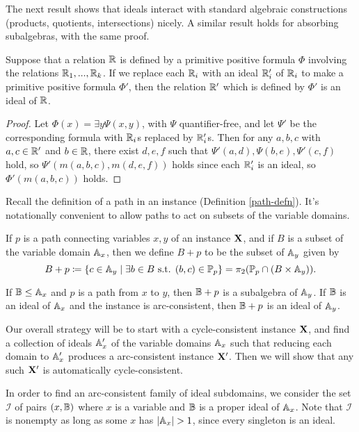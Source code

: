 \documentclass[letterpaper,11pt]{article}
\begin{document}
The next result shows that ideals interact with standard algebraic constructions (products, quotients, intersections) nicely. A similar result holds for absorbing subalgebras, with the same proof.

\begin{prop} Suppose that a relation $\mathbb{R}$ is defined by a primitive positive formula $\Phi$ involving the relations $\mathbb{R}_1, ..., \mathbb{R}_k$. If we replace each $\mathbb{R}_i$ with an ideal $\mathbb{R}_i'$ of $\mathbb{R}_i$ to make a primitive positive formula $\Phi'$, then the relation $\mathbb{R}'$ which is defined by $\Phi'$ is an ideal of $\mathbb{R}$.
\end{prop}
\begin{proof} Let $\Phi(x) = \exists y \Psi(x,y)$, with $\Psi$ quantifier-free, and let $\Psi'$ be the corresponding formula with $\mathbb{R}_i$s replaced by $\mathbb{R}_i'$s. Then for any $a,b,c$ with $a,c \in \mathbb{R}'$ and $b \in \mathbb{R}$, there exist $d,e,f$ such that $\Psi'(a,d), \Psi(b,e), \Psi'(c,f)$ hold, so $\Psi'(m(a,b,c),m(d,e,f))$ holds since each $\mathbb{R}_i'$ is an ideal, so $\Phi'(m(a,b,c))$ holds.
\end{proof}

Recall the definition of a path in an instance (Definition \ref{path-defn}). It's notationally convenient to allow paths to act on subsets of the variable domains.

\begin{defn}\label{path-action-defn} If $p$ is a path connecting variables $x,y$ of an instance $\mathbf{X}$, and if $B$ is a subset of the variable domain $\mathbb{A}_x$, then we define $B + p$ to be the subset of $\mathbb{A}_y$ given by
\[
B + p \coloneqq \{c \in \mathbb{A}_y \mid \exists b \in B \text{ s.t. } (b,c) \in \mathbb{P}_p\} = \pi_2(\mathbb{P}_p\cap (B \times \mathbb{A}_y)).
\]
\end{defn}

\begin{prop} If $\mathbb{B} \le \mathbb{A}_x$ and $p$ is a path from $x$ to $y$, then $\mathbb{B} + p$ is a subalgebra of $\mathbb{A}_y$. If $\mathbb{B}$ is an ideal of $\mathbb{A}_x$ and the instance is arc-consistent, then $\mathbb{B} + p$ is an ideal of $\mathbb{A}_y$.
\end{prop}

Our overall strategy will be to start with a cycle-consistent instance $\mathbf{X}$, and find a collection of ideals $\mathbb{A}_x'$ of the variable domains $\mathbb{A}_x$ such that reducing each domain to $\mathbb{A}_x'$ produces a arc-consistent instance $\mathbf{X}'$. Then we will show that any such $\mathbf{X}'$ is automatically cycle-consistent.

In order to find an arc-consistent family of ideal subdomains, we consider the set $\mathcal{I}$ of pairs $(x,\mathbb{B})$ where $x$ is a variable and $\mathbb{B}$ is a proper ideal of $\mathbb{A}_x$. Note that $\mathcal{I}$ is nonempty as long as some $x$ has $|\mathbb{A}_x| > 1$, since every singleton is an ideal.
\end{document}
